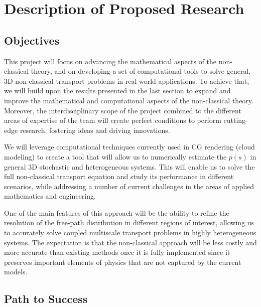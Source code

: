 \documentclass[12pt]{article}
\begin{document}
\section{Description of Proposed Research}

\subsection{Objectives}

This project will focus on advancing the mathematical aspects of the non-classical theory, and on developing a set of computational tools to solve general, 3D non-classical transport problems in real-world applications.
To achieve that, we will build upon the results presented in the last section to expand and improve the mathematical and computational aspects of the non-classical theory.
Moreover, the interdisciplinary scope of the project combined to the different areas of expertise of the team will create perfect conditions to perform cutting-edge research, fostering ideas and driving innovations.

We will leverage computational techniques currently used in CG rendering (cloud modeling) to create a tool that will allow us to numerically estimate the $p(s)$ in general 3D stochastic and heterogeneous systems.
This will enable us to solve the full non-classical transport equation and study its performance in different scenarios, while addressing a number of current challenges in the areas of applied mathematics and engineering.

One of the main features of this approach will be the ability to refine the resolution of the free-path distribution in different regions of interest, allowing us to accurately solve coupled multiscale transport problems in highly heterogeneous systems.
The expectation is that the non-classical approach will be less costly and more accurate than existing methods once it is fully implemented since it preserves important elements of physics that are not captured by the current models.

\subsection{Path to Success}
\end{document}
